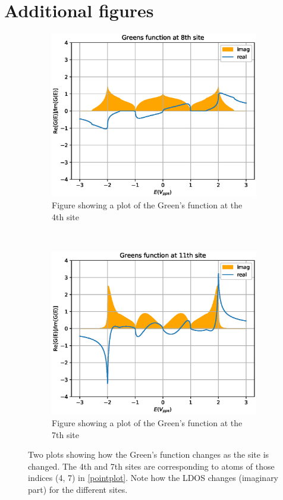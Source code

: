 \section{Additional figures}\label{appfigs}
\begin{figure}[h]
	\centering
	\begin{subfigure}[b]{0.3\textwidth}
		\includegraphics[width=\textwidth]{Figures/BetaimrealTE8.eps}
		\caption{Figure showing a plot of the Green's function at the 4th site}
		\label{4th}
	\end{subfigure}
	~ %
	\begin{subfigure}[b]{0.3\textwidth}
		\includegraphics[width=\textwidth]{Figures/BetaimrealTE11.eps}
		\caption{Figure showing a plot of the Green's function at the 7th site}
		\label{7th}
	\end{subfigure}
	\caption{Two plots showing how the Green's function changes as the site is changed. The 4th and 7th sites are corresponding to atoms of those indices (4, 7) in \cref{pointplot}. Note how the LDOS changes (imaginary part) for the different sites.}\label{siteLDOSplot}
\end{figure}
